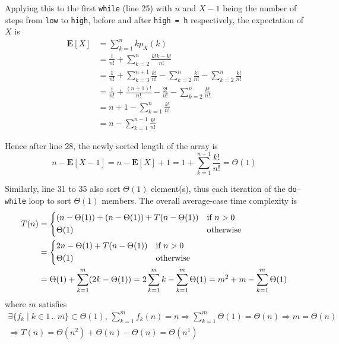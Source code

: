 \documentclass[a4paper,12pt]{article}
\begin{document}
Applying this to the first \verb|while| (line 25) with $n$ and $X - 1$ being
the number of steps from \verb|low| to \verb|high|, before and after
\verb|high = h| respectively, the expectation of $X$ is
\begin{align*}
  \mathbf E[X] &= \sum_{k=1}^n k p_X(k)\\
  &= \frac{1}{n!} + \sum_{k=2}^n\frac{k!k - k!}{n!}\\
  &= \frac{1}{n!} + \sum_{k=3}^{n+1}\frac{k!}{n!}
   - \sum_{k=2}^n\frac{k!}{n!} - \sum_{k=2}^n\frac{k!}{n!}\\
  &= \frac{1}{n!} + \frac{(n+1)!}{n!}
   - \frac{2!}{n!} - \sum_{k=2}^n\frac{k!}{n!}\\
  &= n + 1 - \sum_{k=1}^n\frac{k!}{n!}\\
  &= n - \sum_{k=1}^{n-1}\frac{k!}{n!}
\end{align*}

Hence after line 28, the newly sorted length of the array is
\[n - \mathbf E[X - 1] = n - \mathbf E[X] + 1
  = 1 + \sum_{k=1}^{n-1}\frac{k!}{n!} = \Theta(1)\]

Similarly, line 31 to 35 also sort $\Theta(1)$ element(s), thus each iteration
of the \verb|do|--\verb|while| loop to sort $\Theta(1)$ members. The overall
average-case time complexity is
\begin{align*}
  T(n) &= \begin{dcases}
    (n - \Theta(1)) + (n - \Theta(1)) + T(n - \Theta(1)) &\text{if }n > 0\\
    \Theta(1) &\text{otherwise}
  \end{dcases}\\
  &= \begin{dcases}
    2n - \Theta(1) + T(n - \Theta(1)) &\text{if }n > 0\\
    \Theta(1) &\text{otherwise}
  \end{dcases}\\
  &= \Theta(1) + \sum_{k=1}^m(2k - \Theta(1))
  = 2\sum_{k=1}^m k - \sum_{k=1}^m\Theta(1)
  = m^2 + m - \sum_{k=1}^m\Theta(1)
\end{align*}
where $m$ satisfies
\begin{multline*}
  \exists\{f_k\mid k\in 1\,..\,m\} \subset \Theta(1),\,
  \sum_{k=1}^m f_k(n) = n
  \Longrightarrow \sum_{k=1}^m\Theta(1) = \Theta(n)
  \Longrightarrow m = \Theta(n)\\
  \Longrightarrow T(n) = \Theta\left(n^2\right) + \Theta(n) - \Theta(n)
  = \Theta\left(n^1\right)
\end{multline*}
\end{document}
